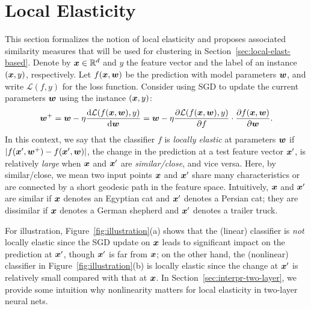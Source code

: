 



\section{Local Elasticity}\label{sec:def}

This section formalizes the notion of local elasticity and proposes associated similarity measures that will be used for clustering in Section~\ref{sec:local-elast-based}. Denote by $\bm{x} \in \mathbb{R}^{d}$ and $y$ the feature vector and the label of an instance $(\bm{x}, y)$, respectively. Let $f(\bm{x}, \bm{w})$ be the prediction with model parameters $\bm{w}$, and write $\mathcal{L}(f, y)$ for the loss function. Consider using SGD to update the current parameters $\bm{w}$ using the instance $(\bm{x}, y)$:
\begin{equation}\label{eq:sgd_update}
\begin{aligned}
\bm{w}^+ = \bm{w} - \eta \frac{\mathrm{d}\mathcal{L}(f(\bm{x}, \bm{w}), y)}{\mathrm{d}\bm{w}} = \bm{w} - \eta \frac{\partial \mathcal{L}(f(\bm{x}, \bm{w}), y)}{\partial f} \cdot \frac{\partial f(\bm{x}, \bm{w})}{\partial \bm{w}}.
\end{aligned}
\end{equation}
In this context, we say that the classifier $f$ is \textit{locally elastic} at parameters $\bm{w}$ if $|f(\bm{x}', \bm{w}^+) - f(\bm{x}', \bm{w})|$, the change in the prediction at a test feature vector $\bm{x}'$, is relatively \textit{large} when $\bm{x}$ and $\bm{x}'$ are \textit{similar/close}, and vice versa. Here, by similar/close, we mean two input points $\bm{x}$ and $\bm{x}'$ share many characteristics or are connected by a short geodesic path in the feature space. Intuitively, $\bm{x}$ and $\bm{x}'$ are similar if $\bm{x}$ denotes an Egyptian cat and $\bm{x}'$ denotes a Persian cat; they are dissimilar if $\bm{x}$ denotes a German shepherd and $\bm{x}'$ denotes a trailer truck.

For illustration, Figure~\ref{fig:illustration}(a) shows that the (linear) classifier is \textit{not} locally elastic since the SGD update on $\bm{x}$ leads to significant impact on the prediction at $\bm{x}'$, though $\bm{x}'$ is far from $\bm{x}$; on the other hand, the (nonlinear) classifier in Figure~\ref{fig:illustration}(b) is locally elastic since the change at $\bm{x}'$ is relatively small compared with that at $\bm{x}$. In Section~\ref{sec:interpr-two-layer}, we provide some intuition why nonlinearity matters for local elasticity in two-layer neural nets. 

